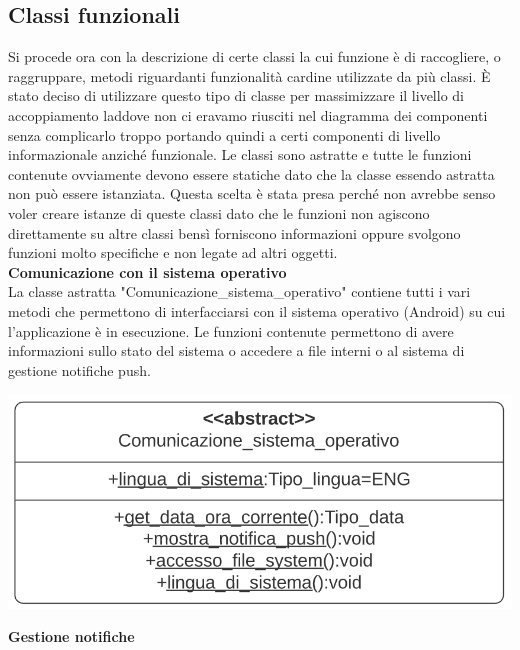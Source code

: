 \documentclass{article}
\begin{document}
      \subsection{Classi funzionali}
      Si procede ora con la descrizione di certe classi la cui funzione è di raccogliere, o raggruppare, metodi riguardanti funzionalità cardine
      utilizzate da più classi. È stato deciso di utilizzare questo tipo di classe per massimizzare il livello di accoppiamento laddove non ci
      eravamo riusciti nel diagramma dei componenti senza complicarlo troppo portando quindi a certi componenti di livello informazionale anziché
      funzionale. Le classi sono astratte e tutte le funzioni contenute ovviamente devono essere statiche dato che la classe essendo astratta non
      può essere istanziata. Questa scelta è stata presa perché non avrebbe senso voler creare istanze di queste classi dato che le funzioni non
      agiscono direttamente su altre classi bensì forniscono informazioni oppure svolgono funzioni molto specifiche e non legate ad altri oggetti.\\ 


      {\large\textbf{Comunicazione con il sistema operativo}}\\

      La classe astratta "Comunicazione\_sistema\_operativo" contiene tutti i vari metodi che permettono di interfacciarsi con il sistema operativo
      (Android) su cui l’applicazione è in esecuzione. Le funzioni contenute permettono di avere informazioni sullo stato del sistema o accedere a
      file interni o al sistema di gestione notifiche push.\\
      \begin{center}
            \includegraphics[scale=0.5]{classi/Comunicazione_sistema_operativo.png}
      \end{center}


      {\large\textbf{Gestione notifiche}}\\
\end{document}
